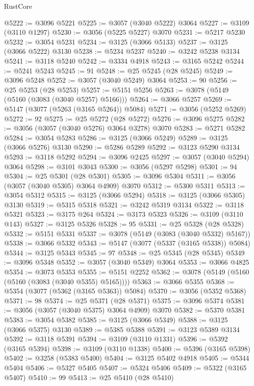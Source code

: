 \begin{lexlean}{RustCore}
\begin{coremodule}
@5222 := @3096 @5221
@5225 := @3057 (@3040 @5222) @3064
@5227 := @3109 (@3110 @1297)
@5230 := @3056 (@5225 @5227) @3070
@5231 := @5217 @5230
@5232 := @3054 @5231
@5234 := @3125 (@3066 @5133)
@5237 := @3125 (@3066 @5222) @3130
@5238 := @5234 @5237
@5240 := @3242 @5238 @3134
@5241 := @3118 @5240
@5242 := @3334 @4918
@5243 := @3165 @5242
@5244 := @5241 @5243
@5245 := 91
@5248 := @25 @5245 (@28 @5245)
@5249 := @3096 @5248
@5252 := @3057 (@3040 @5249) @3064
@5253 := 90
@5256 := @25 @5253 (@28 @5253)
@5257 := @5151 @5256
@5263 := @3078 (@5149 (@5160 (@3083 (@3040 @5257) @5166)))
@5264 := @3066 @5257
@5269 := @5147 (@3077 (@5263 (@3165 @5264)) @5084)
@5271 := @3056 (@5252 @5269)
@5272 := 92
@5275 := @25 @5272 (@28 @5272)
@5276 := @3096 @5275
@5282 := @3056 (@3057 (@3040 @5276) @3064 @3278) @3070
@5283 := @5271 @5282
@5284 := @3054 @5283
@5286 := @3125 (@3066 @5249)
@5289 := @3125 (@3066 @5276) @3130
@5290 := @5286 @5289
@5292 := @3123 @5290 @3134
@5293 := @3118 @5292
@5294 := @3096 @2425
@5297 := @3057 (@3040 @5294) @3064
@5298 := @3101 @3043
@5300 := @3056 (@5297 @5298)
@5301 := 94
@5304 := @25 @5301 (@28 @5301)
@5305 := @3096 @5304
@5311 := @3056 (@3057 (@3040 @5305) @3064 @4909) @3070
@5312 := @5300 @5311
@5313 := @3054 @5312
@5315 := @3125 (@3066 @5294)
@5318 := @3125 (@3066 @5305) @3130
@5319 := @5315 @5318
@5321 := @3242 @5319 @3134
@5322 := @3118 @5321
@5323 := @3175 @264
@5324 := @3173 @5323
@5326 := @3109 (@3110 @143)
@5327 := @3125 @5326
@5328 := 95
@5331 := @25 @5328 (@28 @5328)
@5332 := @5151 @5331
@5337 := @3078 (@5149 (@3083 (@3040 @5332) @5167))
@5338 := @3066 @5332
@5343 := @5147 (@3077 (@5337 (@3165 @5338)) @5084)
@5344 := @3125 @5343
@5345 := 97
@5348 := @25 @5345 (@28 @5345)
@5349 := @3096 @5348
@5352 := @3057 (@3040 @5349) @3064
@5353 := @3066 @4825
@5354 := @3073 @5353
@5355 := @5151 @2252
@5362 := @3078 (@5149 (@5160 (@5160 (@3083 (@3040 @5355) @5165))))
@5363 := @3066 @5355
@5368 := @5354 (@3077 (@5362 (@3165 @5363)) @5084)
@5370 := @3056 (@5352 @5368)
@5371 := 98
@5374 := @25 @5371 (@28 @5371)
@5375 := @3096 @5374
@5381 := @3056 (@3057 (@3040 @5375) @3064 @4909) @3070
@5382 := @5370 @5381
@5383 := @3054 @5382
@5385 := @3125 (@3066 @5349)
@5388 := @3125 (@3066 @5375) @3130
@5389 := @5385 @5388
@5391 := @3123 @5389 @3134
@5392 := @3118 @5391
@5394 := @3109 (@3110 @1331)
@5396 := @5392 (@3165 @5394)
@5398 := @3109 (@3110 @1338)
@5400 := @5396 (@3165 @5398)
@5402 := @3258 (@5383 @5400)
@5404 := @3125 @5402 @4918
@5405 := @5344 @5404
@5406 := @5327 @5405
@5407 := @5324 @5406
@5409 := @5322 (@3165 @5407)
@5410 := 99
@5413 := @25 @5410 (@28 @5410)

\end{coremodule}
\end{lexlean}
